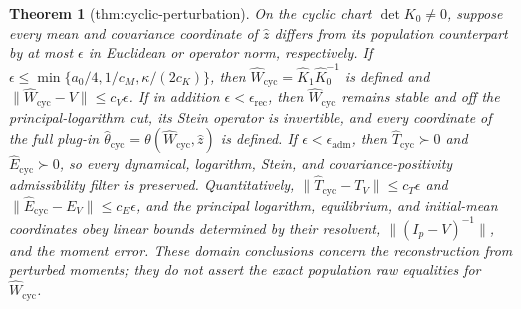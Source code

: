 \documentclass{article}
\newtheorem{theorem}{Theorem}
\begin{document}
\begin{theorem}[thm:cyclic-perturbation]\label{thm:cyclic-perturbation}
On the cyclic chart \(\det K_0\ne0\), suppose every mean and covariance coordinate of \(\widehat z\) differs from its population counterpart by at most \(\epsilon\) in Euclidean or operator norm, respectively. If \(\epsilon\le\min\{a_0/4,1/c_M,\kappa/(2c_K)\}\), then \(\widehat W_{\mathrm{cyc}}=\widehat K_1\widehat K_0^{-1}\) is defined and \(\lVert\widehat W_{\mathrm{cyc}}-V\rVert\le c_V\epsilon\). If in addition \(\epsilon<\epsilon_{\mathrm{rec}}\), then \(\widehat W_{\mathrm{cyc}}\) remains stable and off the principal-logarithm cut, its Stein operator is invertible, and every coordinate of the full plug-in \(\widehat\theta_{\mathrm{cyc}}=\theta(\widehat W_{\mathrm{cyc}},\widehat z)\) is defined. If \(\epsilon<\epsilon_{\mathrm{adm}}\), then \(\widehat T_{\mathrm{cyc}}\succ0\) and \(\widehat E_{\mathrm{cyc}}\succ0\), so every dynamical, logarithm, Stein, and covariance-positivity admissibility filter is preserved. Quantitatively, \(\lVert\widehat T_{\mathrm{cyc}}-T_V\rVert\le c_T\epsilon\) and \(\lVert\widehat E_{\mathrm{cyc}}-E_V\rVert\le c_E\epsilon\), and the principal logarithm, equilibrium, and initial-mean coordinates obey linear bounds determined by their resolvent, \(\lVert(I_p-V)^{-1}\rVert\), and the moment error. These domain conclusions concern the reconstruction from perturbed moments; they do not assert the exact population raw equalities for \(\widehat W_{\mathrm{cyc}}\).
\end{theorem}
\end{document}
